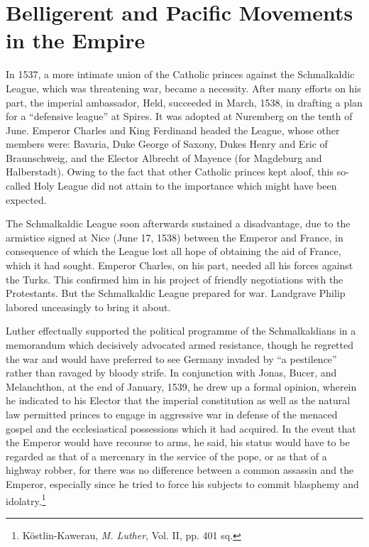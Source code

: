 \section{Belligerent and Pacific Movements in the Empire}

In 1537, a more intimate union of the Catholic princes against the
Schmalkaldic League, which was threatening war, became a necessity.
After many efforts on his part, the imperial ambassador, Held,
succeeded in March, 1538, in drafting a plan for a “defensive league”
at Spires. It was adopted at Nuremberg on the tenth of June. Emperor
Charles and King Ferdinand headed the League, whose other
members were: Bavaria, Duke George of Saxony, Dukes Henry and
Eric of Braunschweig, and the Elector Albrecht of Mayence (for
Magdeburg and Halberstadt). Owing to the fact that other Catholic
princes kept aloof, this so-called Holy League did not attain to the
importance which might have been expected.

The Schmalkaldic League soon afterwards sustained a disadvantage,
due to the armistice signed at Nice (June 17, 1538) between the
Emperor and France, in consequence of which the League lost all
hope of obtaining the aid of France, which it had sought. Emperor
Charles, on his part, needed all his forces against the Turks. This confirmed
him in his project of friendly negotiations with the Protestants.
But the Schmalkaldic League prepared for war. Landgrave Philip
labored unceasingly to bring it about.

Luther effectually supported the political programme of the
Schmalkaldians in a memorandum which decisively advocated armed
resistance, though he regretted the war and would have preferred to
see Germany invaded by “a pestilence” rather than ravaged by bloody
strife. In conjunction with Jonas, Bucer, and Melanchthon, at the end
of January, 1539, he drew up a formal opinion, wherein he indicated
to his Elector that the imperial constitution as well as the natural
law permitted princes to engage in aggressive war in defense of the
menaced gospel and the ecclesiastical possessions which it had acquired.
In the event that the Emperor would have recourse to arms,
he said, his status would have to be regarded as that of a mercenary
in the service of the pope, or as that of a highway robber, for there
was no difference between a common assassin and the Emperor, especially
since he tried to force his subjects to commit blasphemy and
idolatry.\footnote{Köstlin-Kawerau, \textit{M. Luther}, Vol. II, pp. 401 sq.}

